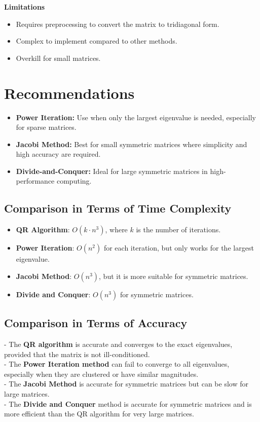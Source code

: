 \documentclass{article}
\begin{document}
\textbf{Limitations}
\begin{itemize}
    \item Requires preprocessing to convert the matrix to tridiagonal form.
    \item Complex to implement compared to other methods.
    \item Overkill for small matrices.
\end{itemize}
\section{Recommendations}
\begin{itemize}
    \item \textbf{Power Iteration:} Use when only the largest eigenvalue is needed, especially for sparse matrices.
    \item \textbf{Jacobi Method:} Best for small symmetric matrices where simplicity and high accuracy are required.
    \item \textbf{Divide-and-Conquer:} Ideal for large symmetric matrices in high-performance computing.
\end{itemize}

\subsection{Comparison in Terms of Time Complexity}
\begin{itemize}
    \item \textbf{QR Algorithm}: \( O(k \cdot n^3) \), where \( k \) is the number of iterations.
    \item \textbf{Power Iteration}: \( O(n^2) \) for each iteration, but only works for the largest eigenvalue.
    \item \textbf{Jacobi Method}: \( O(n^3) \), but it is more suitable for symmetric matrices.
    \item \textbf{Divide and Conquer}: \( O(n^3) \) for symmetric matrices.
\end{itemize}

\subsection{Comparison in Terms of Accuracy}
- The \textbf{QR algorithm} is accurate and converges to the exact eigenvalues, provided that the matrix is not ill-conditioned.\\
- The \textbf{Power Iteration method} can fail to converge to all eigenvalues, especially when they are clustered or have similar magnitudes.\\
- The \textbf{Jacobi Method} is accurate for symmetric matrices but can be slow for large matrices.\\
- The \textbf{Divide and Conquer} method is accurate for symmetric matrices and is more efficient than the QR algorithm for very large matrices.
\end{document}
